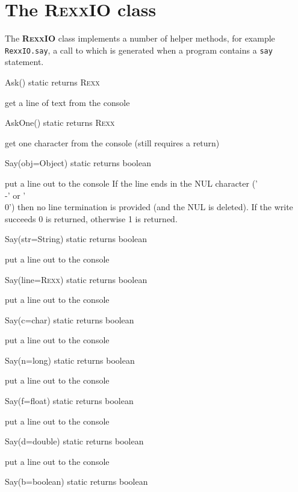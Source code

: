 \section{The R\textsc{exx}IO class}\label{refrexxio}
 
The \textbf{R\textsc{exx}IO} class implements a number of helper methods, for example \texttt{RexxIO.say}, a call to which is generated when a program contains a \texttt{say} statement. 

\begin{description}
  \item{Ask() static returns R\textsc{exx}}

get a line of text from the console
  \item {AskOne() static returns R\textsc{exx}}

get one character from the console (still requires a return)
 \item{Say(obj=Object) static returns boolean}

put a line out to the console
    If the line ends in the NUL character ('\\-' or '\\0') then no
    line termination is provided (and the NUL is deleted).
    If the write succeeds 0 is returned, otherwise 1 is returned.
 
  \item{Say(str=String) static returns boolean}

put a line out to the console
  \item{Say(line=R\textsc{exx}) static returns boolean}

put a line out to the console
  \item{Say(c=char) static returns boolean}

put a line out to the console
  \item{Say(n=long) static returns boolean}

put a line out to the console
  \item{Say(f=float)   static returns boolean}

put a line out to the console
  \item{Say(d=double)  static returns boolean}

put a line out to the console
  \item{Say(b=boolean) static returns boolean}


\end{description}
